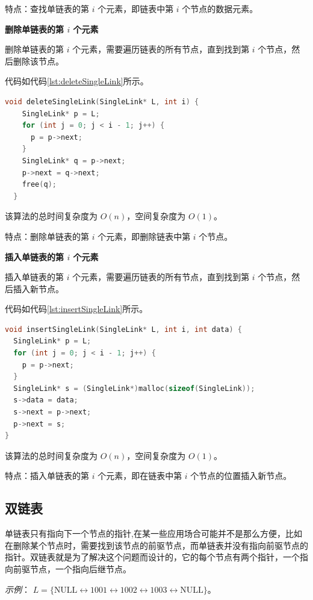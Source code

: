\documentclass[lang=cn,newtx,10pt,scheme=chinese]{../elegantbook}
\begin{document}
特点：查找单链表的第 $i$ 个元素，即链表中第 $i$ 个节点的数据元素。

\textbf{删除单链表的第 $i$ 个元素}

删除单链表的第 $i$ 个元素，需要遍历链表的所有节点，直到找到第 $i$ 个节点，然后删除该节点。

代码如代码\ref{lst:deleteSingleLink}所示。

\begin{lstlisting}[language=C++, caption={删除单链表的第 $i$ 个元素示例代码}, label={lst:deleteSingleLink}]
  void deleteSingleLink(SingleLink* L, int i) {
    SingleLink* p = L;
    for (int j = 0; j < i - 1; j++) {
      p = p->next;
    }
    SingleLink* q = p->next;
    p->next = q->next;
    free(q);
  }
  \end{lstlisting}
  该算法的总时间复杂度为 $O(n)$，空间复杂度为 $O(1)$。

  特点：删除单链表的第 $i$ 个元素，即删除链表中第 $i$ 个节点。

\textbf{插入单链表的第 $i$ 个元素}

插入单链表的第 $i$ 个元素，需要遍历链表的所有节点，直到找到第 $i$ 个节点，然后插入新节点。

代码如代码\ref{lst:insertSingleLink}所示。

\begin{lstlisting}[language=C++, caption={插入单链表的第 $i$ 个元素示例代码}, label={lst:insertSingleLink}]
void insertSingleLink(SingleLink* L, int i, int data) {
  SingleLink* p = L;
  for (int j = 0; j < i - 1; j++) {
    p = p->next;
  }
  SingleLink* s = (SingleLink*)malloc(sizeof(SingleLink));
  s->data = data;
  s->next = p->next;
  p->next = s;
}
\end{lstlisting}
该算法的总时间复杂度为 $O(n)$，空间复杂度为 $O(1)$。

特点：插入单链表的第 $i$ 个元素，即在链表中第 $i$ 个节点的位置插入新节点。
   



  \subsection{双链表}
  单链表只有指向下一个节点的指针,在某一些应用场合可能并不是那么方便，比如在删除某个节点时，需要找到该节点的前驱节点，而单链表并没有指向前驱节点的指针。双链表就是为了解决这个问题而设计的，它的每个节点有两个指针，一个指向前驱节点，一个指向后继节点。
  
  \textit{示例}：
  $L = \{\text{NULL} \leftrightarrow 1001 \leftrightarrow 1002 \leftrightarrow 1003 \leftrightarrow \text{NULL}\}$。
\end{document}
